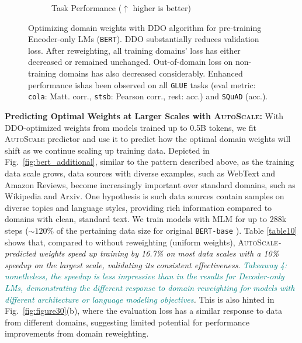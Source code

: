 \documentclass{article} %
\begin{document}
\begin{figure}[h!]
\begin{subfigure}[b]{0.48\textwidth}
        \caption{Task Performance ($\uparrow$ higher is better)}
        \label{fig:figure2b}
    \end{subfigure}\vspace{-0.5em}
    \caption{\small{Optimizing domain weights with \textsc{DDO} algorithm for pre-training Encoder-only LMs (\texttt{BERT}). \textsc{DDO} substantially reduces validation loss. After reweighting, all training domains' loss has either decreased or remained unchanged. Out-of-domain loss on non-training domains has also decreased considerably. Enhanced performance ishas been observed on all \texttt{GLUE} tasks (eval metric: \texttt{cola}: Matt. corr., \texttt{stsb}: Pearson corr., rest: acc.) and \texttt{SQuAD} (acc.). }\normalsize}
    \label{fig:figure2}\vspace{-0.5em}
\end{figure}





\textbf{Predicting Optimal Weights at Larger Scales with \textsc{AutoScale}:}
With \textsc{DDO}-optimized weights from models trained up to 0.5B tokens, we fit \textsc{AutoScale} predictor and use it to predict how the optimal domain weights will shift as we continue scaling up training data. Depicted in Fig.~\ref{fig:bert_additional}, similar to the pattern described above, as the training data scale grows, data sources with diverse examples, such as WebText and Amazon Reviews, become increasingly important over standard domains, such as Wikipedia and Arxiv. One hypothesis is such data sources contain samples on diverse topics and language styles, providing rich information compared to domains with clean, standard text.
We train models with MLM for up to 288k steps ($\sim120\%$ of the pertaining data size for original \texttt{BERT-base} \citep{devlin2018bert}). Table \ref{table10} shows that, compared to without reweighting (uniform weights), \textsc{AutoScale}\textit{-predicted weights speed up training by 16.7\% on most data scales with a 10\% speedup on the largest scale, validating its consistent effectiveness}.
\textit{\textcolor{teal}{Takeaway 4: nonetheless, the speedup is less impressive than in the results for Decoder-only LMs, demonstrating the different response to domain reweighting for models with different architecture or language modeling objectives}.} This is also hinted in Fig.~\ref{fig:figure30}(b), where the evaluation loss has a similar response to data from different domains, suggesting limited potential for performance improvements from domain reweighting. 
\end{document}
